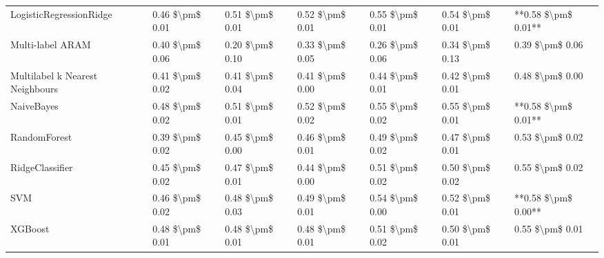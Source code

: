 \begin{tabular}{lllllll}
        LogisticRegressionRidge & 0.46 \$\textbackslash pm\$ 0.01 &           0.51 \$\textbackslash pm\$ 0.01 &       0.52 \$\textbackslash pm\$ 0.01 &        0.55 \$\textbackslash pm\$ 0.01 &                         0.54 \$\textbackslash pm\$ 0.01 & **0.58 \$\textbackslash pm\$ 0.01** \\
               Multi-label ARAM & 0.40 \$\textbackslash pm\$ 0.06 &           0.20 \$\textbackslash pm\$ 0.10 &       0.33 \$\textbackslash pm\$ 0.05 &        0.26 \$\textbackslash pm\$ 0.06 &                         0.34 \$\textbackslash pm\$ 0.13 &     0.39 \$\textbackslash pm\$ 0.06 \\
Multilabel k Nearest Neighbours & 0.41 \$\textbackslash pm\$ 0.02 &           0.41 \$\textbackslash pm\$ 0.04 &       0.41 \$\textbackslash pm\$ 0.00 &        0.44 \$\textbackslash pm\$ 0.01 &                         0.42 \$\textbackslash pm\$ 0.01 &     0.48 \$\textbackslash pm\$ 0.00 \\
                     NaiveBayes & 0.48 \$\textbackslash pm\$ 0.02 &           0.51 \$\textbackslash pm\$ 0.01 &       0.52 \$\textbackslash pm\$ 0.02 &        0.55 \$\textbackslash pm\$ 0.02 &                         0.55 \$\textbackslash pm\$ 0.01 & **0.58 \$\textbackslash pm\$ 0.01** \\
                   RandomForest & 0.39 \$\textbackslash pm\$ 0.02 &           0.45 \$\textbackslash pm\$ 0.00 &       0.46 \$\textbackslash pm\$ 0.01 &        0.49 \$\textbackslash pm\$ 0.02 &                         0.47 \$\textbackslash pm\$ 0.01 &     0.53 \$\textbackslash pm\$ 0.02 \\
                RidgeClassifier & 0.45 \$\textbackslash pm\$ 0.02 &           0.47 \$\textbackslash pm\$ 0.01 &       0.44 \$\textbackslash pm\$ 0.00 &        0.51 \$\textbackslash pm\$ 0.02 &                         0.50 \$\textbackslash pm\$ 0.02 &     0.55 \$\textbackslash pm\$ 0.02 \\
                            SVM & 0.46 \$\textbackslash pm\$ 0.02 &           0.48 \$\textbackslash pm\$ 0.03 &       0.49 \$\textbackslash pm\$ 0.01 &        0.54 \$\textbackslash pm\$ 0.00 &                         0.52 \$\textbackslash pm\$ 0.01 & **0.58 \$\textbackslash pm\$ 0.00** \\
                        XGBoost & 0.48 \$\textbackslash pm\$ 0.01 &           0.48 \$\textbackslash pm\$ 0.01 &       0.48 \$\textbackslash pm\$ 0.01 &        0.51 \$\textbackslash pm\$ 0.02 &                         0.50 \$\textbackslash pm\$ 0.01 &     0.55 \$\textbackslash pm\$ 0.01 \\
\bottomrule
\end{tabular}
